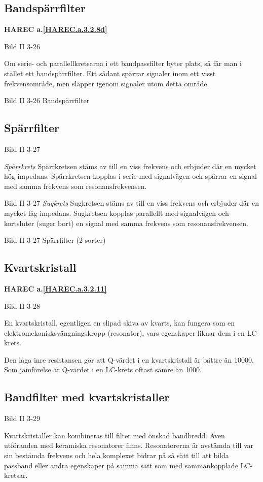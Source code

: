 \subsection{Bandspärrfilter}
\textbf{HAREC a.\ref{HAREC.a.3.2.8d}\label{myHAREC.a.3.2.8d}}

Bild II 3-26

Om serie- och parallellkretsarna i ett bandpassfilter byter plats, så får man
i stället ett bandspärrfilter. Ett sådant spärrar signaler inom ett visst
frekvensområde, men släpper igenom signaler utom detta område.

Bild II 3-26 Bandspärrfilter

\subsection{Spärrfilter}

Bild II 3-27

\emph{Spärrkrets}
Spärrkretsen stäms av till en viss frekvens  och erbjuder där en mycket hög
impedans. Spärrkretsen kopplas i serie med signalvägen och spärrar en signal
med samma frekvens som resonansfrekvensen.

Bild II 3-27
\emph{Sugkrets}
Sugkretsen stäms av till en viss frekvens och erbjuder där en mycket låg
impedans. Sugkretsen kopplas parallellt med signalvägen och kortsluter (suger
bort) en signal med samma frekvens som resonansfrekvensen.

Bild II 3-27 Spärrfilter (2 sorter)

\subsection{Kvartskristall}
\textbf{HAREC a.\ref{HAREC.a.3.2.11}\label{myHAREC.a.3.2.11}}

Bild II 3-28

En kvartskristall, egentligen en slipad skiva av kvarts, kan fungera som en
elektromekanisksvängningskropp (resonator), vars egenskaper liknar dem i en
LC-krets.

Den låga inre resistansen gör att Q-värdet i en kvartskristall är bättre än
10000. Som jämförelse är Q-värdet i en LC-krets oftast sämre än 1000.

\subsection{Bandfilter med kvartskristaller}

Bild II 3-29

Kvartskristaller kan kombineras till filter med önskad bandbredd. Även
utföranden med keramiska resonatorer finns. Resonatorerna är avstämda till var
sin bestämda frekvens och hela komplexet bidrar på så sätt till att bilda
passband eller andra egenskaper på samma sätt som med sammankopplade LC-kretsar.


